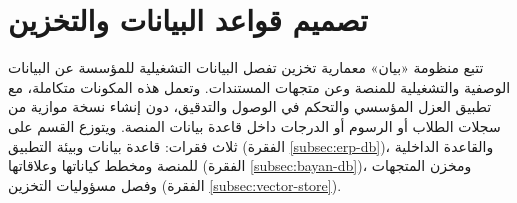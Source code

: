 \section{تصميم قواعد البيانات والتخزين}
\label{sec:db-design}

تتبع منظومة «بيان» معمارية تخزين تفصل البيانات التشغيلية للمؤسسة عن البيانات الوصفية والتشغيلية للمنصة وعن متجهات المستندات. وتعمل هذه المكونات متكاملة، مع تطبيق العزل المؤسسي والتحكم في الوصول والتدقيق، دون إنشاء نسخة موازية من سجلات الطلاب أو الرسوم أو الدرجات داخل قاعدة بيانات المنصة. ويتوزع القسم على ثلاث فقرات: قاعدة بيانات  وبيئة التطبيق (الفقرة \ref{subsec:erp-db})، والقاعدة الداخلية للمنصة ومخطط كياناتها وعلاقاتها (الفقرة \ref{subsec:bayan-db})، ومخزن المتجهات  \cite{qdrant2024} وفصل مسؤوليات التخزين (الفقرة \ref{subsec:vector-store}).

